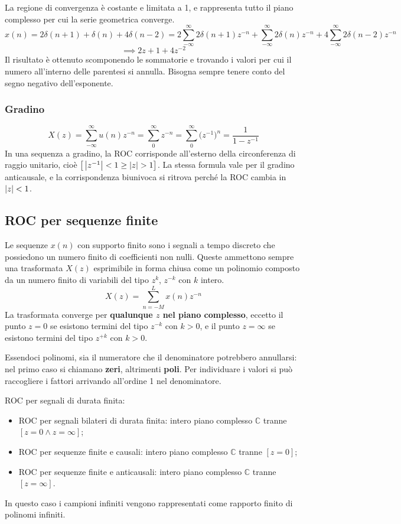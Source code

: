 La regione di convergenza è costante e limitata a 1, e rappresenta tutto il piano complesso per cui la serie geometrica converge.
$$x(n) = 2\delta(n+1) + \delta(n) + 4\delta(n-2) = 2\sum_{-\infty}^{\infty}2\delta(n+1)z^{-n} + \sum_{-\infty}^{\infty}2\delta(n)z^{-n} + 4\sum_{-\infty}^{\infty}2\delta(n-2)z^{-n}$$
$$\implies 2z + 1 + 4z^{-2}$$
Il risultato è ottenuto scomponendo le sommatorie e trovando i valori per cui il numero all'interno delle parentesi si annulla. Bisogna sempre tenere conto del segno negativo dell'esponente.

\subsubsection{Gradino}
$$X(z) = \sum_{-\infty}^{\infty}u(n)z^{-n} = \sum_{0}^{\infty}z^{-n} = \sum_{0}^{\infty}\big(z^{-1}\big)^n = \frac{1}{1 - z^{-1}}$$
In una sequenza a gradino, la ROC corrisponde all'esterno della circonferenza di raggio unitario, cioè $\big[\left|z^{-1}\right| < 1 \geq \left|z\right| > 1\big]$. La stessa formula vale per il gradino anticausale, e la corrispondenza biunivoca si ritrova perché la ROC cambia in $\left|z\right| < 1$.

\subsection{ROC per sequenze finite}
Le sequenze $x(n)$ con supporto finito sono i segnali a tempo discreto che possiedono un numero finito di coefficienti non nulli. Queste ammettono sempre una trasformata $X(z)$ esprimibile in forma chiusa come un polinomio composto da un numero finito di variabili del tipo $z^k$, $z^{-k}$ con $k$ intero.
$$X(z) = \sum_{n=-M}^{L} x(n)z^{-n}$$
La trasformata converge per \textbf{qualunque $z$ nel piano complesso}, eccetto il punto $z = 0$ se esistono termini del tipo $z^{-k}$ con $k > 0$, e il punto $z = \infty$ se esistono termini del tipo $z^{+k}$ con $k > 0$.

Essendoci polinomi, sia il numeratore che il denominatore potrebbero annullarsi: nel primo caso si chiamano \textbf{zeri}, altrimenti \textbf{poli}. Per individuare i valori si può raccogliere i fattori arrivando all'ordine 1 nel denominatore.

ROC per segnali di durata finita:
\begin{itemize}
	\item ROC per segnali bilateri di durata finita: intero piano complesso $\mathbb{C}$ tranne $[z = 0 \land z = \infty]$;
	\item ROC per sequenze finite e causali: intero piano complesso $\mathbb{C}$ tranne $[z = 0]$;
	\item ROC per sequenze finite e anticausali: intero piano complesso $\mathbb{C}$ tranne $[z = \infty]$.
\end{itemize}
In questo caso i campioni infiniti vengono rappresentati come rapporto finito di polinomi infiniti.

